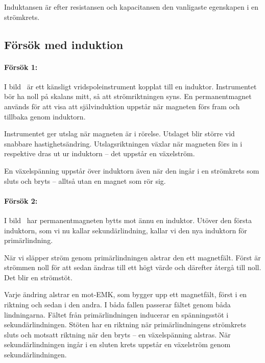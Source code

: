 Induktansen är efter resistansen och kapacitansen den vanligaste egenskapen i
en strömkrets.

\subsection{Försök med induktion}


\paragraph{Försök 1:}
I bild~ är ett känsligt vridspoleinstrument kopplat
till en induktor.
Instrumentet bör ha noll på skalans mitt, så att strömriktningen syns.
En permanentmagnet används för att visa att självinduktion uppstår när
magneten förs fram och tillbaka genom induktorn.

Instrumentet ger utslag när magneten är i rörelse.
Utslaget blir större vid snabbare hastighetsändring.
Utslagsriktningen växlar när magneten förs in i respektive dras ut ur induktorn
-- det uppstår en växelström.

En växelspänning uppstår över induktorn även när den ingår i en strömkrets som
sluts och bryts -- alltså utan en magnet som rör sig.

\paragraph{Försök 2:}
I bild~ har permanentmagneten bytts mot ännu en
induktor.
Utöver den första induktorn, som vi nu kallar sekundärlindning, kallar vi den
nya induktorn för primärlindning.

När vi släpper ström genom primärlindningen alstrar den ett magnetfält.
Först är strömmen noll för att sedan ändras till ett högt värde och därefter
återgå till noll. Det blir en strömstöt.

Varje ändring alstrar en mot-EMK, som bygger upp ett magnetfält, först i en
riktning och sedan i den andra. I båda fallen passerar fältet genom båda
lindningarna. Fältet från primärlindningen inducerar en spänningsstöt i
sekundärlindningen. Stöten har en riktning när primärlindningens strömkrets
sluts och motsatt riktning när den bryts -- en växelspänning alstras.
När sekundärlindningen ingår i en sluten krets uppstår en växelström genom
sekundärlindningen.

